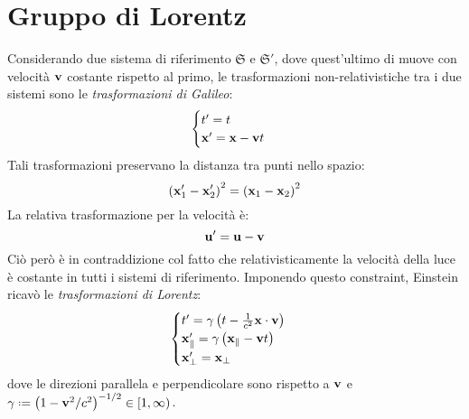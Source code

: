 
\section{Gruppo di Lorentz}

Considerando due sistema di riferimento $ \mathfrak{S} $ e $ \mathfrak{S}' $, dove quest'ultimo di muove con velocità $ \mathbf{v} $ costante rispetto al primo, le trasformazioni non-relativistiche tra i due sistemi sono le \textit{trasformazioni di Galileo}:
\begin{equation}
	\begin{cases}
		t' = t \\
		\mathbf{x}' = \mathbf{x} - \mathbf{v} t
	\end{cases}
	\label{eq:10.1}
\end{equation}
Tali trasformazioni preservano la distanza tra punti nello spazio:
\begin{equation}
	\left( \mathbf{x}'_1 - \mathbf{x}'_2 \right)^2 = \left( \mathbf{x}_1 - \mathbf{x}_2 \right)^2
	\label{eq:10.2}
\end{equation}
La relativa trasformazione per la velocità è:
\begin{equation}
	\mathbf{u}' = \mathbf{u} - \mathbf{v}
	\label{eq:10.3}
\end{equation}
Ciò però è in contraddizione col fatto che relativisticamente la velocità della luce è costante in tutti i sistemi di riferimento. Imponendo questo constraint, Einstein ricavò le \textit{trasformazioni di Lorentz}:
\begin{equation}
	\begin{cases}
		t' = \gamma \left( t - \frac{1}{c^2} \mathbf{x} \cdot \mathbf{v} \right) \\
		\mathbf{x}'_{\parallel} = \gamma \left( \mathbf{x}_{\parallel} - \mathbf{v} t \right) \\
		\mathbf{x}'_{\perp} = \mathbf{x}_{\perp}
	\end{cases}
	\label{eq:10.4}
\end{equation}
dove le direzioni parallela e perpendicolare sono rispetto a $ \mathbf{v} $ e $ \gamma \defeq \left( 1 - \ve{v}^2 / c^2 \right)^{-1/2} \in [1,\infty) $.

